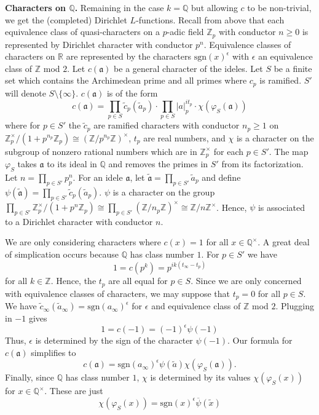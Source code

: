 \documentclass[12pt, letterpaper, twoside]
{article}
\newcommand{\Z}{{\mathbb Z}} %
\newcommand{\Q}{{\mathbb Q}} %
\newcommand{\R}{{\mathbb R}} %
\newcommand{\aI}{{\mathfrak{a}}} %
\newcommand{\ol}{\overline}
\begin{document}
\textbf{Characters on $\Q$.} Remaining in the case $k = \Q$ but allowing $c$ to
be non-trivial, we get the (completed) Dirichlet $L$-functions. Recall from
above that each equivalence class of quasi-characters on a $p$-adic field $\Z_p$
with conductor $n \geq 0$ is represented by Dirichlet character with conductor
$p^n$. Equivalence classes of characters on $\R$ are represented by the
characters $\text{sgn}(x)^{\epsilon}$ with $\epsilon$ an equivalence class of
$\Z$ mod $2$. Let $c(\aI)$ be a general character of the ideles. Let $S$ be a
finite set which contains the Archimedean prime and all primes where $c_p$ is
ramified. $S'$ will denote $S \setminus \{\infty\}$. $c(\aI)$ is of the form
\[c(\aI) = \prod_{p \in S} \tilde{c}_p(\tilde{a}_p) \cdot \prod_{p \in S}
|a|_p^{it_p} \cdot \chi(\varphi_S(\aI))\] where for $p \in S'$ the $\tilde{c}_p$
are ramified characters with conductor $n_p \geq 1$ on $\Z_p^\times/(1 +
p^{n_p}\Z_p) \cong (\Z/p^{n_p}\Z)^\times$, $t_p$ are real numbers, and $\chi$ is
a character on the subgroup of nonzero rational numbers which are in
$\Z_p^\times$ for each $p \in S'$. The map $\varphi_S$ takes $\aI$ to its ideal
in $\Q$ and removes the primes in $S'$ from its factorization. Let $n = \prod_{p
\in S'} p^n_p$. For an idele $\aI$, let $\tilde{\aI} = \prod_{p \in S'}
\tilde{a}_p$ and define $\psi(\tilde{\aI}) = \prod_{p \in S'}
\tilde{c}_p(\tilde{a}_p)$. $\psi$ is a character on the group $\prod_{p \in S'}
\Z_p^\times/(1 + p^n\Z_p) \cong \prod_{p \in S'} (\Z/n_p\Z)^\times \cong
\Z/n\Z^\times$. Hence, $\psi$ is associated to a Dirichlet character with
conductor $n$.

We are only considering characters where $c(x) = 1$ for all $x \in \Q^\times$. A
great deal of simplication occurs because $\Q$ has class number $1$. For $p \in
S'$ we have
\[1 = c(p^k) = p^{ik(t_\infty - t_p)}\] for all $k \in \Z$. Hence, the $t_p$ are
all equal for $p \in S$. Since we are only concerned with equivalence classes of
characters, we may suppose that $t_p = 0$ for all $p \in S$. We have
$\tilde{c}_\infty(\tilde{a}_\infty) = \text{sgn}(a_\infty)^\epsilon$ for
$\epsilon$ and equivalence class of $\Z$ mod $2$. Plugging in $-1$ gives
\[1 = c(-1) = (-1)^{\epsilon} \psi(-1)\] Thus, $\epsilon$ is determined by the
sign of the character $\psi(-1)$. Our formula for $c(\aI)$ simplifies to
\[c(\aI) = \text{sgn}(a_\infty)^\epsilon \psi(\tilde{a}) \chi(\varphi_S(\aI)).\]
Finally, since $\Q$ has class number $1$, $\chi$ is determined by its values
$\chi(\varphi_S(x))$ for $x \in \Q^\times$. These are just
\[\chi(\varphi_S(x)) = \text{sgn}(x)^\epsilon \ol{\psi}(\tilde{x})\]
\end{document}
